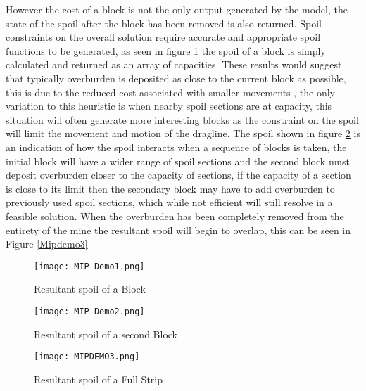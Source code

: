 However the cost of a block is not the only output generated by the model, the state of the spoil after the block has been removed is also returned. Spoil constraints on the overall solution require accurate and appropriate spoil functions to be generated, as seen in figure \ref{MIPDemo1} the spoil of a block is simply calculated and returned as an array of capacities. These results would suggest that typically overburden is deposited as close to the current block as possible, this is due to the reduced cost associated with smaller movements , the only variation to this heuristic is when nearby spoil sections are at capacity, this situation will often generate more interesting blocks  as the constraint on the spoil will limit the movement and motion of the dragline. The spoil shown in figure \ref{MIPDemo2} is an indication of how the spoil interacts when a sequence of blocks is taken, the initial block will have a wider range of spoil sections and the second block must deposit overburden closer to the capacity of sections, if the capacity of a section is close to its limit then the secondary block may have to add overburden to previously used spoil sections, which while not efficient will still resolve in a feasible solution. When the overburden has been completely removed from the entirety of the mine the resultant spoil will begin to overlap, this can be seen in Figure \ref{Mipdemo3}

\begin{figure}[h]
\caption{Resultant spoil of a Block}
\label{MIPDemo1}
\texttt{[image: MIP\_Demo1.png]}
\end{figure}

\begin{figure}[h]
\caption{Resultant spoil of a second Block}
\label{MIPDemo2}
\texttt{[image: MIP\_Demo2.png]}
\end{figure}
\begin{figure}[h]
\caption{Resultant spoil of a Full Strip}
\label{MIPDemo3}
\texttt{[image: MIPDEMO3.png]}
\end{figure}

